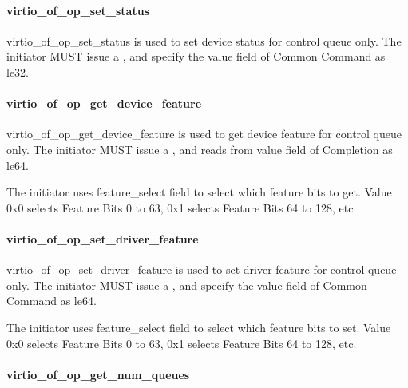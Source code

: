 \paragraph{virtio_of_op_set_status}\label{sec:Virtio Transport Options / Virtio Over Fabrics / Transmission Protocol / Opcodes Definition / virtio_of_op_set_status}

virtio_of_op_set_status is used to set device status for control queue only.
The initiator MUST issue a ,
and specify the value field of Common Command as le32.

\paragraph{virtio_of_op_get_device_feature}\label{sec:Virtio Transport Options / Virtio Over Fabrics / Transmission Protocol / Opcodes Definition / virtio_of_op_get_device_feature}

virtio_of_op_get_device_feature is used to get device feature for control queue only.
The initiator MUST issue a ,
and reads from value field of Completion as le64.

The initiator uses feature_select field to select which feature bits to get. Value 0x0 selects Feature Bits 0 to 63, 0x1 selects Feature Bits 64 to 128, etc.

\paragraph{virtio_of_op_set_driver_feature}\label{sec:Virtio Transport Options / Virtio Over Fabrics / Transmission Protocol / Opcodes Definition / virtio_of_op_set_driver_feature}

virtio_of_op_set_driver_feature is used to set driver feature for control queue only.
The initiator MUST issue a ,
and specify the value field of Common Command as le64.

The initiator uses feature_select field to select which feature bits to set.
Value 0x0 selects Feature Bits 0 to 63, 0x1 selects Feature Bits 64 to 128, etc.

\paragraph{virtio_of_op_get_num_queues}\label{sec:Virtio Transport Options / Virtio Over Fabrics / Transmission Protocol / Opcodes Definition / virtio_of_op_get_num_queues}

